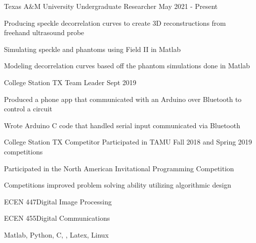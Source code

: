 \documentclass[11pt]{article} %
\begin{document}
\begin{description}
\squish

{Texas A$\&$M University}
{Undergraduate Researcher}
{May 2021 - Present}

Producing speckle decorrelation curves to create 3D reconstructions from freehand ultrasound probe

Simulating speckle and phantoms using Field II in Matlab

Modeling decorrelation curves based off the phantom simulations done in Matlab


{College Station TX}
{Team Leader}
{Sept 2019}

Produced a phone app that communicated with an Arduino over Bluetooth to control a circuit

Wrote Arduino C code that handled serial input communicated via Bluetooth

{College Station TX}
{Competitor}
{}
Participated in TAMU Fall 2018 and Spring 2019 competitions

Participated in the North American Invitational Programming Competition

Competitions improved problem solving ability utilizing algorithmic design


\end{description}

 {}{}

{ECEN 447}{Digital Image Processing}

{ECEN 455}{Digital Communications}

{Matlab, Python, C, \CPP, Latex, Linux}
\end{document}
